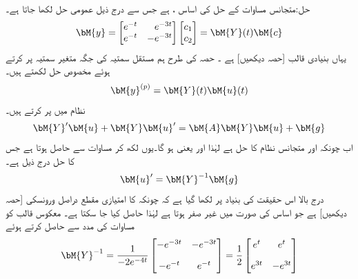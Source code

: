 حل:متجانس مساوات کے حل کی اساس ،  ہے جس سے درج ذیل عمومی حل لکھا جاتا ہے۔
\begin{align}\label{مساوات_نظام_مقدار_معلوم_وائے}
\bM{y}=\begin{bmatrix*}[r] e^{-t}&e^{-3t} \\ e^{-t} &-e^{-3t} \end{bmatrix*} \begin{bmatrix} c_1\\c_2 \end{bmatrix}=\bM{Y}(t)\bM{c}
\end{align}
یہاں  بنیادی قالب [حصہ  دیکھیں] ہے ۔ حصہ  کی طرح ہم مستقل سمتیہ  کی جگہ متغیر سمتیہ  پر کرتے ہوئے مخصوص حل  لکھتے ہیں۔
\begin{align}
\bM{y}^{(p)}=\bM{Y}(t)\bM{u}(t)
\end{align}
نظام  میں  پر کرتے ہیں۔
\begin{align}\label{مساوات_نظام_بنیادی_نظام_الف}
\bM{Y}'\bM{u}+\bM{Y}\bM{u}'=\bM{A}\bM{Y}\bM{u}+\bM{g}
\end{align}
اب چونکہ  اور  متجانس نظام کا حل ہے لہٰذا  اور
  یعنی ہو گا۔یوں  لکھ کر مساوات  سے   حاصل ہوتا ہے جس کا حل درج ذیل ہے۔
\begin{align}
\bM{u}'=\bM{Y}^{-1}\bM{g}
\end{align}
درج بالا اس حقیقت کی بنیاد پر لکھا گیا ہے کہ چونکہ  کا امتیازی مقطع دراصل ورونسکی [حصہ  دیکھیں]  ہے جو اساس کی صورت میں غیر صفر ہوتا ہے لہٰذا  حاصل کیا جا سکتا ہے۔ معکوس قالب کو مساوات  کی مدد سے حاصل کرتے ہوئے
\begin{align*}
\bM{Y}^{-1}=\frac{1}{-2e^{-4t}}\begin{bmatrix} -e^{-3t} & -e^{-3t}\\[1em] -e^{-t}& e^{-t} \end{bmatrix}=
\frac{1}{2}\begin{bmatrix} e^{t} & e^{t}\\[1em] e^{3t}& -e^{3t}   \end{bmatrix}
\end{align*}
